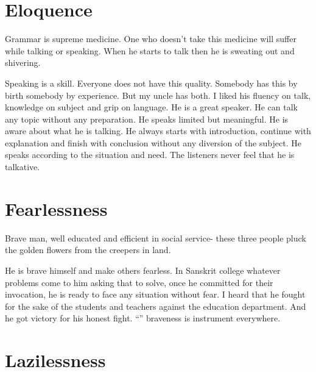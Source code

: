 \section{Eloquence {\normalsize{}}}

\begin{verse}
\end{verse} 
Grammar is supreme medicine. One who doesn’t take this medicine will suffer while talking or speaking. When he starts to talk then he is sweating out and shivering.
 
Speaking is a skill. Everyone does not have this quality. Somebody has this by birth somebody by experience. But my uncle has both. I liked his fluency on talk, knowledge on subject and grip on language. He is a great speaker. He can talk any topic without any preparation. He speaks limited but meaningful. He is aware about what he is talking. He always starts with introduction, continue with explanation and finish with conclusion without any diversion of the subject. He speaks according to the situation and need. The listeners never feel that he is talkative.
 
\section{Fearlessness {\normalsize{}}}

\begin{verse}
\end{verse}
Brave man, well educated and efficient in social service- these three people pluck the golden flowers from the creepers in land.

He is brave himself and make others fearless. In Sanskrit college whatever problems come to him asking that to solve, once he committed for their invocation, he is ready to face any situation without fear. I heard that he fought for the sake of the students and teachers against the education department. And he got victory for his honest fight. “{\fontsize{8.7}{12}\selectfont{}}” braveness is instrument everywhere.

\section{Lazilessness {\normalsize{}}}

